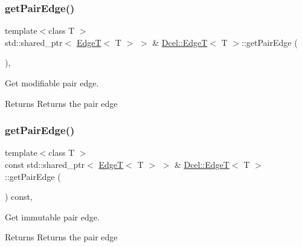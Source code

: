 \subsubsection{\texorpdfstring{get\+Pair\+Edge()}{getPairEdge()}\hspace{0.1cm}{\footnotesize\ttfamily [1/2]}}
{\footnotesize\ttfamily template$<$class T $>$ \\
std\+::shared\+\_\+ptr$<$ \hyperlink{classDcel_1_1EdgeT}{EdgeT}$<$ T $>$ $>$ \& \hyperlink{classDcel_1_1EdgeT}{Dcel\+::\+EdgeT}$<$ T $>$\+::get\+Pair\+Edge (\begin{DoxyParamCaption}{ }\end{DoxyParamCaption})\hspace{0.3cm}{\ttfamily [inline]}, {\ttfamily [noexcept]}}



Get modifiable pair edge. 

\begin{DoxyReturn}{Returns}
Returns the pair edge 
\end{DoxyReturn}
\mbox{\label{classDcel_1_1EdgeT_a46f28f7da631e2d0f7f3139d1167b392}} 
\subsubsection{\texorpdfstring{get\+Pair\+Edge()}{getPairEdge()}\hspace{0.1cm}{\footnotesize\ttfamily [2/2]}}
{\footnotesize\ttfamily template$<$class T $>$ \\
const std\+::shared\+\_\+ptr$<$ \hyperlink{classDcel_1_1EdgeT}{EdgeT}$<$ T $>$ $>$ \& \hyperlink{classDcel_1_1EdgeT}{Dcel\+::\+EdgeT}$<$ T $>$\+::get\+Pair\+Edge (\begin{DoxyParamCaption}{ }\end{DoxyParamCaption}) const\hspace{0.3cm}{\ttfamily [inline]}, {\ttfamily [noexcept]}}



Get immutable pair edge. 

\begin{DoxyReturn}{Returns}
Returns the pair edge 
\end{DoxyReturn}
\mbox{\label{classDcel_1_1EdgeT_ad97e2996c4559b8977d807a5627d5251}} 
